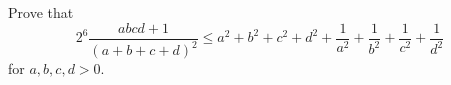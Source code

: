 Prove that \[ 2^6 \frac{abcd+1}{(a+b+c+d)^2} \le a^2+b^2+c^2+d^2+\frac{1}{a^2}+\frac{1}{b^2}+\frac{1}{c^2}+\frac{1}{d^2} \] for $a,b,c,d > 0$.